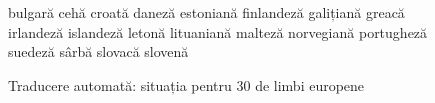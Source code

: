\documentclass[]{../../metanetpaper}
\begin{document}
\begin{multicols}{2}
\begin{figure}[tb]
\begin{tabular}
bulgară \newline 
cehă \newline
croată \newline 
daneză \newline 
estoniană \newline 
finlandeză \newline 
galițiană \newline 
greacă \newline 
irlandeză \newline 
islandeză \newline 
letonă \newline 
lituaniană \newline 
malteză \newline 
norvegiană \newline 
portugheză \newline 
suedeză \newline 
sârbă \newline 
slovacă \newline 
slovenă \newline 
\end{tabular}
\caption{Traducere automată: situația pentru 30 de limbi europene}
\label{fig:mt_cluster_de}
\end{figure}


\end{multicols}
\end{document}
